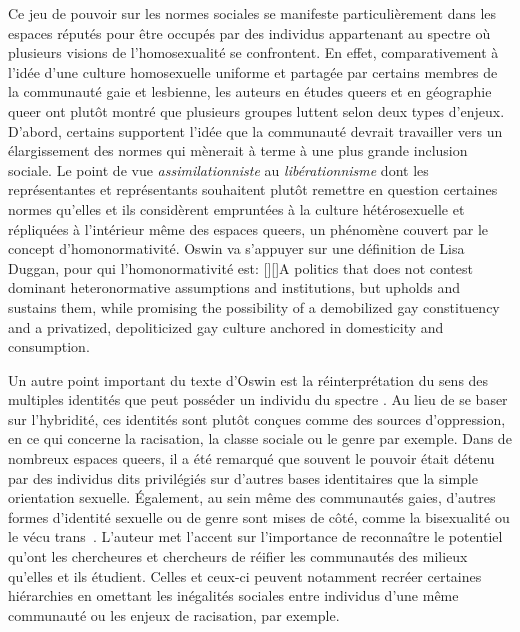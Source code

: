 Ce jeu de pouvoir sur les normes sociales se manifeste particulièrement dans les espaces réputés pour être occupés par des individus appartenant au spectre \lgbt{} où plusieurs visions de l'homosexualité se confrontent.
En effet, comparativement à l'idée d'une culture homosexuelle uniforme et partagée par certains membres de la communauté gaie et lesbienne, les auteurs en études queers et en géographie queer ont plutôt montré que plusieurs groupes luttent selon deux types d'enjeux.
D'abord, certains supportent l'idée que la communauté devrait travailler vers un élargissement des normes qui mènerait à terme à une plus grande inclusion sociale.
Le point de vue \emph{assimilationniste} au \emph{libérationnisme} dont les représentantes et représentants souhaitent plutôt remettre en question certaines normes qu'elles et ils considèrent empruntées à la culture hétérosexuelle et répliquées à l'intérieur même des espaces queers, un phénomène couvert par le concept d'homonormativité.
Oswin va s'appuyer sur une définition de Lisa Duggan, pour qui l'homonormativité est:
[{\cite[50]{Duggan2003}}][]{A politics that does not contest dominant heteronormative assumptions and institutions, but upholds and sustains them, while promising the possibility of a demobilized gay constituency and a privatized, depoliticized gay culture anchored in domesticity and consumption}.

Un autre point important du texte d'Oswin est la réinterprétation du sens des multiples identités que peut posséder un individu du spectre \lgbt{}.
Au lieu de se baser sur l'hybridité, ces identités sont plutôt conçues comme des sources d'oppression, en ce qui concerne la racisation, la classe sociale ou le genre par exemple.
Dans de nombreux espaces queers, il a été remarqué que souvent le pouvoir était détenu par des individus dits privilégiés sur d'autres bases identitaires que la simple orientation sexuelle.
Également, au sein même des communautés gaies, d'autres formes d'identité sexuelle ou de genre sont mises de côté, comme la bisexualité ou le vécu trans~\citep[93]{Oswin2008}.
L'auteur met l'accent sur l'importance de reconnaître le potentiel qu'ont les chercheures et chercheurs de réifier les communautés des milieux qu'elles et ils étudient.
Celles et ceux-ci peuvent notamment recréer certaines hiérarchies en omettant les inégalités sociales entre individus d'une même communauté ou les enjeux de racisation, par exemple.

